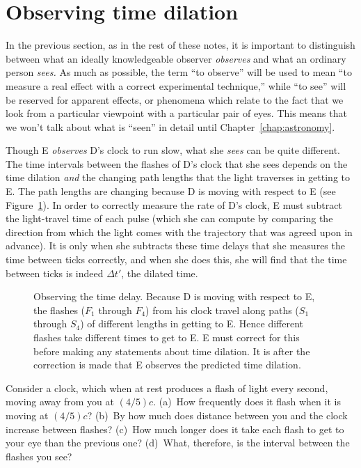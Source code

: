 \section{Observing time dilation}
\label{sec:observing}

In the previous section, as in the rest of these notes, it is
important to distinguish between what an ideally knowledgeable
observer {\em observes\/} and what an
ordinary person {\em sees.\/} As much as possible, the term ``to
observe'' will be used to mean ``to measure a real effect with a
correct experimental technique,'' while ``to see'' will be reserved
for apparent effects, or phenomena which relate to the fact that we
look from a particular viewpoint with a particular pair of eyes.  This
means that we won't talk about what is ``seen'' in detail until
Chapter~\ref{chap:astronomy}.

Though E {\em observes\/} D's clock to run slow, what she {\em sees\/}
can be quite different.  The time intervals between the flashes of D's
clock that she sees depends on the time dilation {\em and\/} the
changing path lengths that the light traverses in getting to E.  The
path lengths are changing because D is moving with respect to E (see
Figure~\ref{fig:observing}).  In order to correctly measure the rate
of D's clock, E must subtract the light-travel time of each pulse
(which she can compute by comparing the direction from which the light
comes with the trajectory that was agreed upon in advance).  It is
only when she subtracts these time delays that she measures the time
between ticks correctly, and when she does this, she will find that
the time between ticks is indeed $\Delta t'$, the dilated time.

\begin{figure}
\caption[Observing time delay]{Observing the time delay.  Because D is
moving with respect to E, the flashes ($F_1$ through $F_4$) from his
clock travel along paths ($S_1$ through $S_4$) of different lengths in
getting to E.  Hence different flashes take different times to get to
E.  E must correct for this before making any statements about time
dilation.  It is after the correction is made that E observes the
predicted time dilation.}
\label{fig:observing}
\end{figure}

\begin{problem}
Consider a clock, which when at rest produces a flash of light every
second, moving away from you at $(4/5)c$.  (a)~How frequently does it
flash when it is moving at $(4/5)c$?  (b)~By how much does distance
between you and the clock increase between flashes?  (c)~How much
longer does it take each flash to get to your eye than the previous
one?  (d)~What, therefore, is the interval between the flashes you
see?
\end{problem}


